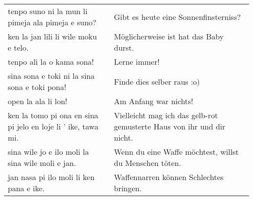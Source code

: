 \begin{supertabular}{p{5,5cm}|ll}
tenpo suno ni la mun li pimeja ala pimeja e suno? && Gibt es heute eine Sonnenfinsterniss? \\ 
ken la jan lili li wile moku e telo.  && Möglicherweise ist hat das Baby durst. \\
tenpo ali la o kama sona!  && Lerne immer!  \\
sina sona e toki ni la sina sona e toki pona!  && Finde dies selber raus  :o) \\
open la ala li lon! && Am Anfang war nichts! \\
ken la tomo pi ona en sina pi jelo en loje li ' ike, tawa mi. && Vielleicht mag ich das gelb-rot gemusterte Haus von ihr und dir nicht. \\
sina wile jo e ilo moli la sina wile moli e jan. && Wenn du eine Waffe möchtest, willst du Menschen töten. \\
jan nasa pi ilo moli li ken pana e ike. && Waffennarren können Schlechtes bringen. \\
\end{supertabular}  

